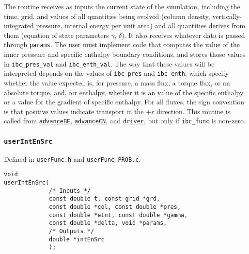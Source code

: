 \documentclass[12pt]{article}
\begin{document}
The routine receives as inputs the current state of the simulation, including the time, grid, and values of all quantities being evolved (column density, vertically-integrated pressure, internal energy per unit area) and all quantities derives from them (equation of state parameters $\gamma$, $\delta$). It also receives whatever data is passed through \verb=params=. The user must implement code that computes the value of the inner pressure and specific enthalpy boundary conditions, and stores those values in \verb=ibc_pres_val= and \verb=ibc_enth_val=. The way that these values will be interpreted depends on the values of \verb=ibc_pres= and \verb=ibc_enth=, which specify whether the value expected is, for pressure, a mass flux, a torque flux, or an absolute torque, and, for enthalpy, whether it is an value of the specific enthalpy or a value for the gradient of specific enthalpy. For all fluxes, the sign convention is that positive values indicate transport in the $+r$ direction. This routine is called from \hyperref[sssec:advanceBE]{\texttt{advanceBE}}, \hyperref[sssec:advanceCN]{\texttt{advanceCN}}, and \hyperref[sssec:driver]{\texttt{driver}}, but only if \verb=ibc_func= is non-zero.

\subsubsection{\texttt{userIntEnSrc}}
\label{sssec:userIntEnSrc}

Defined in \verb=userFunc.h= and \verb=userFunc_PROB.c=.
\begin{verbatim}
void
userIntEnSrc(
             /* Inputs */
             const double t, const grid *grd,
             const double *col, const double *pres,
             const double *eInt, const double *gamma, 
             const double *delta, void *params, 
             /* Outputs */
             double *intEnSrc
             );
\end{verbatim}
\end{document}
